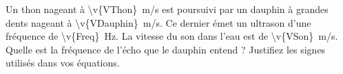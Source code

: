 Un thon nageant à \qty{\v{VThon}}{m/s} est poursuivi par un dauphin à grandes dents nageant à \qty{\v{VDauphin}}{m/s}. Ce dernier émet un ultrason d’une fréquence de \qty{\v{Freq}}{Hz}. La vitesse du son dans l’eau est de \qty{\v{VSon}}{m/s}. Quelle est la fréquence de l’écho que le dauphin entend ? Justifiez les signes utilisés dans vos équations.
